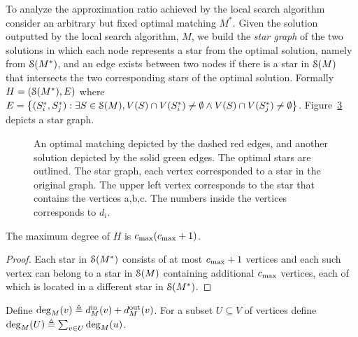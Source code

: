 To analyze the approximation ratio achieved by the local search
algorithm consider an arbitrary but fixed optimal matching $M^*$.
Given the solution outputted by the local search algorithm, $M$, we
build the \emph{star graph} of the two solutions in which each node
represents a star from the optimal solution, namely from $\calS(M^*)$,
and an edge exists between two nodes if there is a star in $\calS(M)$
that intersects the two corresponding stars of the optimal solution.
%
Formally $H = (\calS(M^*), E)$ where
$
{E = \set{(S^*_i, S^*_j) : \exists S \in \calS(M), 
         V(S) \cap V(S^*_i) \neq \emptyset \land
         V(S) \cap V(S^*_j) \neq \emptyset}}
$.
Figure~\ref{fig:conflict} depicts a star graph.

\begin{figure}[t]
%
\begin{subfigure}[t]{.4\linewidth}
\caption{\label{subfloat:graph}}

\end{subfigure}
%
\hfill
%
\begin{subfigure}[t]{.4\linewidth}
\caption{\label{subfloat:conflict}}

\end{subfigure}
%
\caption[]{
An optimal matching depicted by the dashed red edges,
and another solution depicted by the solid green edges.
The optimal stars are outlined.  
The star graph, each vertex corresponded to a star in the original graph. 
The upper left vertex corresponds to the star that contains the vertices a,b,c.
The numbers inside the vertices corresponds to $d_i$.   
}
\label{fig:conflict}
\end{figure}  

\begin{lemma}
The maximum degree of $H$ is $\cmax(\cmax+1)$.
\end{lemma}
\begin{proof}
Each star in $\calS(M^*)$ consists of at most $\cmax+1$ vertices and
each such vertex can belong to a star in $\calS(M)$ containing
additional $\cmax$ vertices, each of which is located in a different
star in $\calS(M^*)$.
\end{proof}


Define $\deg_M(v) \eqdf \din[M](v) + \dout[M](v)$.  For a subset
$U \subseteq V$ of vertices define $\deg_M(U) \eqdf \sum_{v \in
U} \deg_M(u)$.

